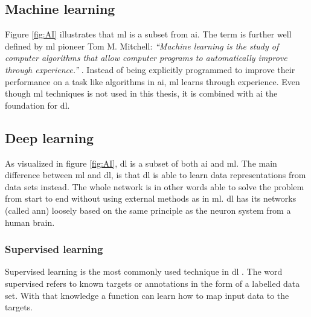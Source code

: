 \documentclass[USenglish]{ifimaster}  %
\begin{document}
\subsection{Machine learning}
Figure \ref{fig:AI} illustrates that \ac{ml} is a subset from \ac{ai}. The term is further well defined by \ac{ml} pioneer Tom M. Mitchell:
\newline
\newline
\textit{“Machine learning is the study of computer algorithms that allow computer programs to automatically improve through experience.”} \cite{tom_mitchell}.
\newline
\newline
Instead of being explicitly programmed to improve their performance on a task like algorithms in \ac{ai}, \ac{ml} learns through experience. Even though \ac{ml} techniques is not used in this thesis, it is combined with \ac{ai} the foundation for \ac{dl}.

\subsection{Deep learning}
As visualized in figure \ref{fig:AI}, \ac{dl} is a subset of both \ac{ai} and \ac{ml}. The main difference between \ac{ml} and \ac{dl},  is that \ac{dl} is able to learn data representations from data sets instead. The whole network is in other words able to solve the problem from start to end without using external methods as in \ac{ml}. \ac{dl} has its networks (called \ac{ann}) loosely based on the same principle as the neuron system from a human brain. 

\subsubsection{Supervised learning}
Supervised learning is the most commonly used technique in \ac{dl} \cite{Francois_Deep_learning_with_python}. The word supervised refers to known targets or annotations in the form of a labelled data set. With that knowledge a function can learn how to map input data to the targets. 
\end{document}
